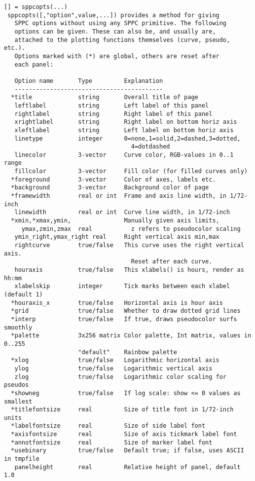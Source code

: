 \documentclass[a4paper]{article}
\begin{document}
\begin{tscreen}
\begin{verbatim}
[] = sppcopts(...)
 sppcopts([,"option",value,...]) provides a method for giving
   SPPC options without using any SPPC primitive. The following
   options can be given. These can also be, and usually are,
   attached to the plotting functions themselves (curve, pseudo, etc.).
   Options marked with (*) are global, others are reset after
   each panel:

   Option name       Type         Explanation
   ------------------------------------------
  *title             string       Overall title of page
   leftlabel         string       Left label of this panel
   rightlabel        string       Right label of this panel
   xrightlabel       string       Right label on bottom horiz axis
   xleftlabel        string       Left label on bottom horiz axis
   linetype          integer      0=none,1=solid,2=dashed,3=dotted,
                                    4=dotdashed
   linecolor         3-vector     Curve color, RGB-values in 0..1 range
   fillcolor         3-vector     Fill color (for filled curves only)
  *foreground        3-vector     Color of axes, labels etc.
  *background        3-vector     Background color of page
  *framewidth        real or int  Frame and axis line width, in 1/72-inch
   linewidth         real or int  Curve line width, in 1/72-inch
  *xmin,*xmax,ymin,               Manually given axis limits,
     ymax,zmin,zmax  real           z refers to pseudocolor scaling
   ymin_right,ymax_right real     Right vertical axis min,max
   rightcurve        true/false   This curve uses the right vertical axis.
                                    Reset after each curve.
   houraxis          true/false   This xlabels() is hours, render as hh:mm
   xlabelskip        integer      Tick marks between each xlabel (default 1)
  *houraxis_x        true/false   Horizontal axis is hour axis
  *grid              true/false   Whether to draw dotted grid lines
  *interp            true/false   If true, draws pseudocolor surfs smoothly
  *palette           3x256 matrix Color palette, Int matrix, values in 0..255
                     "default"    Rainbow palette
  *xlog              true/false   Logarithmic horizontal axis
   ylog              true/false   Logarithmic vertical axis
   zlog              true/false   Logarithmic color scaling for pseudos
  *showneg           true/false   If log scale: show <= 0 values as smallest
  *titlefontsize     real         Size of title font in 1/72-inch units
  *labelfontsize     real         Size of side label font
  *axisfontsize      real         Size of axis tickmark label font
  *annotfontsize     real         Size of marker label font
  *usebinary         true/false   Default true; if false, uses ASCII in tmpfile
   panelheight       real         Relative height of panel, default 1.0


\end{verbatim}
\end{tscreen}
\end{document}
